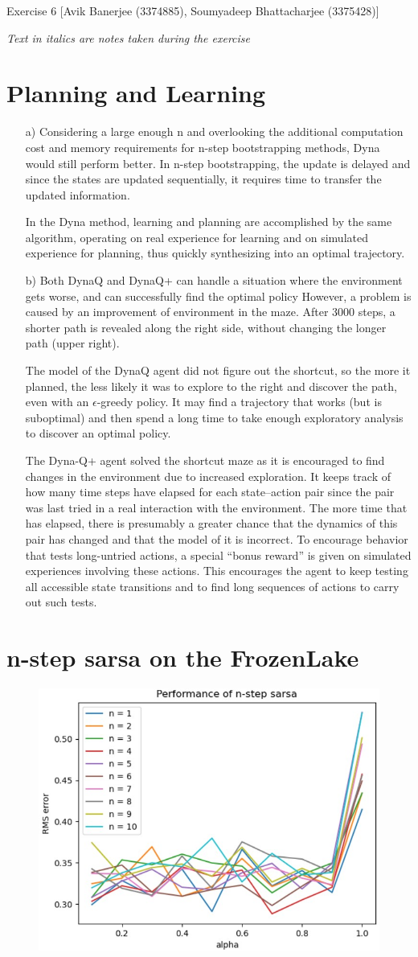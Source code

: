 \documentclass{article}
\begin{document}
\begin{center}
	{\LARGE Exercise 6}\linebreak
	{\large [Avik Banerjee (3374885), Soumyadeep Bhattacharjee (3375428)]}
\end{center}
\textit{Text in italics are notes taken during the exercise}
\section{Planning and Learning}
\begin{enumerate}
	\item[a)]Considering a large enough n and overlooking the additional computation cost and memory requirements for n-step bootstrapping methods, Dyna would still perform better. In n-step bootstrapping, the update is delayed and since the states are updated sequentially, it requires time to transfer the updated information.
	
	In the Dyna method, learning and planning are accomplished by the same algorithm, operating on real experience for learning and on simulated experience for planning, thus quickly synthesizing into an optimal trajectory. 
	\item[b)] Both DynaQ and DynaQ+ can handle a situation where the environment gets worse, and can successfully find the optimal policy
	However, a problem is caused by an improvement of environment in the maze. After 3000 steps, a shorter path is revealed along the right side, without changing the longer path (upper right). 
	
	The model of the DynaQ agent did not figure out the shortcut, so the more it planned, the less likely it was to explore to the right and discover the path, even with an $\epsilon$-greedy policy. It may find a trajectory that works (but is suboptimal) and then spend a long time to take enough exploratory analysis to discover an optimal policy.
	
	The Dyna-Q+ agent solved the shortcut maze as it is encouraged to find changes in the environment due to increased exploration. It keeps track of how many time steps have elapsed for each state–action pair since the pair was last tried in a real interaction with the environment. The more time that has elapsed, there is presumably a greater chance that the dynamics of this pair has changed and that the model of it is incorrect. To encourage behavior that tests long-untried actions, a special “bonus reward” is given on simulated experiences involving these actions. This encourages the agent to keep testing all accessible state transitions and to find long sequences of actions to carry out such tests.
\end{enumerate}
\section{n-step sarsa on the FrozenLake}
\begin{figure}[H]
	\includegraphics[width=0.5\linewidth]{graph.jpg}
\end{figure}
\end{document}
